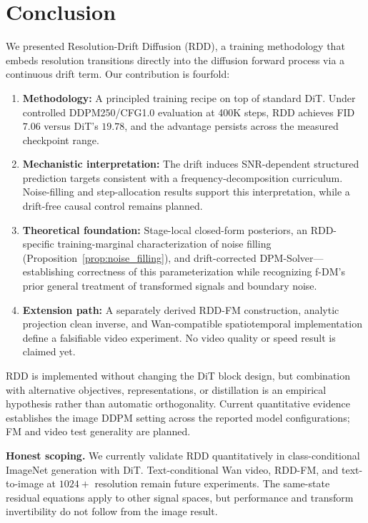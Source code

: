 \documentclass[10pt]{article}
\begin{document}
\section{Conclusion}
\label{sec:conclusion}

We presented Resolution-Drift Diffusion (RDD), a training methodology that embeds resolution transitions directly into the diffusion forward process via a continuous drift term.
Our contribution is fourfold:


\begin{enumerate}
    \item \textbf{Methodology:} A principled training recipe on top of standard DiT. Under controlled DDPM250/CFG1.0 evaluation at 400K steps, RDD achieves FID $7.06$ versus DiT's $19.78$, and the advantage persists across the measured checkpoint range.
    \item \textbf{Mechanistic interpretation:} The drift induces SNR-dependent structured prediction targets consistent with a frequency-decomposition curriculum. Noise-filling and step-allocation results support this interpretation, while a drift-free causal control remains planned.
    \item \textbf{Theoretical foundation:} Stage-local closed-form posteriors, an RDD-specific training-marginal characterization of noise filling (Proposition~\ref{prop:noise_filling}), and drift-corrected DPM-Solver---establishing correctness of this parameterization while recognizing f-DM's prior general treatment of transformed signals and boundary noise.
    \item \textbf{Extension path:} A separately derived RDD-FM construction, analytic projection clean inverse, and Wan-compatible spatiotemporal implementation define a falsifiable video experiment. No video quality or speed result is claimed yet.
\end{enumerate}

RDD is implemented without changing the DiT block design, but combination with alternative objectives, representations, or distillation is an empirical hypothesis rather than automatic orthogonality.
Current quantitative evidence establishes the image DDPM setting across the reported model configurations; FM and video test generality are planned.

\textbf{Honest scoping.}
We currently validate RDD quantitatively in class-conditional ImageNet generation with DiT. Text-conditional Wan video, RDD-FM, and text-to-image at $1024+$ resolution remain future experiments. The same-state residual equations apply to other signal spaces, but performance and transform invertibility do not follow from the image result.
\end{document}
